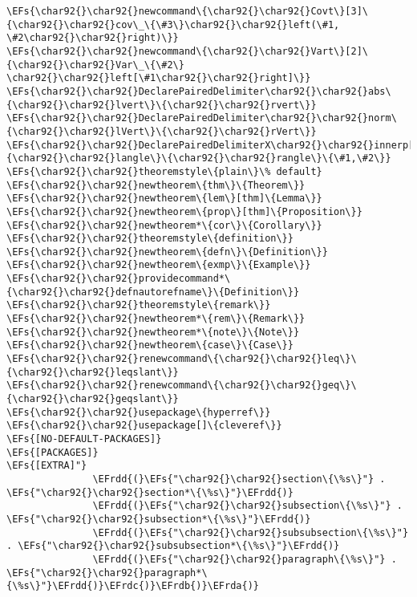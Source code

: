 \documentclass[12pt]{article}
\theoremstyle{plain}%
\theoremstyle{definition}
\theoremstyle{remark}
\newcommand{\EFs}[1]{\textcolor{EFs}{#1}} %
\newcommand{\EFrda}[1]{\textcolor{EFrda}{#1}} %
\newcommand{\EFrdb}[1]{\textcolor{EFrdb}{#1}} %
\newcommand{\EFrdc}[1]{\textcolor{EFrdc}{#1}} %
\newcommand{\EFrdd}[1]{\textcolor{EFrdd}{#1}} %
\begin{document}
\begin{Code}
\begin{Verbatim}
\EFs{\char92{}\char92{}newcommand\{\char92{}\char92{}Covt\}[3]\{\char92{}\char92{}cov\_\{\#3\}\char92{}\char92{}left(\#1, \#2\char92{}\char92{}right)\}}
\EFs{\char92{}\char92{}newcommand\{\char92{}\char92{}Vart\}[2]\{\char92{}\char92{}Var\_\{\#2\} \char92{}\char92{}left[\#1\char92{}\char92{}right]\}}
\EFs{\char92{}\char92{}DeclarePairedDelimiter\char92{}\char92{}abs\{\char92{}\char92{}lvert\}\{\char92{}\char92{}rvert\}}
\EFs{\char92{}\char92{}DeclarePairedDelimiter\char92{}\char92{}norm\{\char92{}\char92{}lVert\}\{\char92{}\char92{}rVert\}}
\EFs{\char92{}\char92{}DeclarePairedDelimiterX\char92{}\char92{}innerp[2]\{\char92{}\char92{}langle\}\{\char92{}\char92{}rangle\}\{\#1,\#2\}}
\EFs{\char92{}\char92{}theoremstyle\{plain\}\% default}
\EFs{\char92{}\char92{}newtheorem\{thm\}\{Theorem\}}
\EFs{\char92{}\char92{}newtheorem\{lem\}[thm]\{Lemma\}}
\EFs{\char92{}\char92{}newtheorem\{prop\}[thm]\{Proposition\}}
\EFs{\char92{}\char92{}newtheorem*\{cor\}\{Corollary\}}
\EFs{\char92{}\char92{}theoremstyle\{definition\}}
\EFs{\char92{}\char92{}newtheorem\{defn\}\{Definition\}}
\EFs{\char92{}\char92{}newtheorem\{exmp\}\{Example\}}
\EFs{\char92{}\char92{}providecommand*\{\char92{}\char92{}defnautorefname\}\{Definition\}}
\EFs{\char92{}\char92{}theoremstyle\{remark\}}
\EFs{\char92{}\char92{}newtheorem*\{rem\}\{Remark\}}
\EFs{\char92{}\char92{}newtheorem*\{note\}\{Note\}}
\EFs{\char92{}\char92{}newtheorem\{case\}\{Case\}}
\EFs{\char92{}\char92{}renewcommand\{\char92{}\char92{}leq\}\{\char92{}\char92{}leqslant\}}
\EFs{\char92{}\char92{}renewcommand\{\char92{}\char92{}geq\}\{\char92{}\char92{}geqslant\}}
\EFs{\char92{}\char92{}usepackage\{hyperref\}}
\EFs{\char92{}\char92{}usepackage[]\{cleveref\}}
\EFs{[NO-DEFAULT-PACKAGES]}
\EFs{[PACKAGES]}
\EFs{[EXTRA]"}
               \EFrdd{(}\EFs{"\char92{}\char92{}section\{\%s\}"} . \EFs{"\char92{}\char92{}section*\{\%s\}"}\EFrdd{)}
               \EFrdd{(}\EFs{"\char92{}\char92{}subsection\{\%s\}"} . \EFs{"\char92{}\char92{}subsection*\{\%s\}"}\EFrdd{)}
               \EFrdd{(}\EFs{"\char92{}\char92{}subsubsection\{\%s\}"} . \EFs{"\char92{}\char92{}subsubsection*\{\%s\}"}\EFrdd{)}
               \EFrdd{(}\EFs{"\char92{}\char92{}paragraph\{\%s\}"} . \EFs{"\char92{}\char92{}paragraph*\{\%s\}"}\EFrdd{)}\EFrdc{)}\EFrdb{)}\EFrda{)}
\end{Verbatim}
\end{Code}
\end{document}
